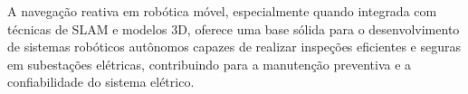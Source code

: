 A navegação reativa em robótica móvel, especialmente quando integrada com técnicas de SLAM e modelos 3D, oferece uma base sólida para o desenvolvimento de sistemas robóticos autônomos capazes de realizar inspeções eficientes e seguras em subestações elétricas, contribuindo para a manutenção preventiva e a confiabilidade do sistema elétrico.
